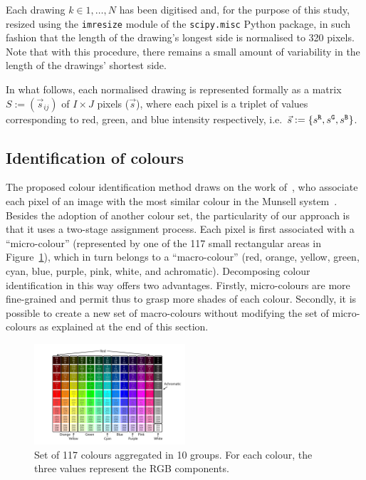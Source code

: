 \documentclass[11pt,a4paper]{article}
\begin{document}
Each drawing $k \in 1,\dots, N$ has been digitised and, for the purpose of this study, resized using the {\tt imresize} module of the {\tt scipy.misc} Python package, in such fashion that the length of the drawing's longest side is normalised to 320 pixels. Note that with this procedure, there remains a small amount of variability in the length of the drawings' shortest side. 

In what follows, each normalised drawing is represented formally as a matrix $S := (\vec{s}_{ij})$ of $I \times J$ pixels ($\vec{s}$), where each pixel is a triplet of values corresponding to red, green, and blue intensity respectively, i.e.~$\vec{s} := \{ s^{\tt \scriptstyle R}, s^{\tt \scriptstyle G}, s^{\tt \scriptstyle B} \}$.

\subsection{Identification of colours}
\label{sec:identification}

The proposed colour identification method draws on the work of~\citet{kimbaelee2007}, who associate each pixel of an image with the most similar colour in the Munsell system~\cite{Munsell1912}. 
Besides the adoption of another colour set, the particularity of our approach is that it uses a two-stage assignment process. Each pixel is first associated with a ``micro-colour'' (represented by one of the 117 small rectangular areas in Figure~\ref{fig:colour_set}), which in turn belongs to a ``macro-colour'' (red, orange, yellow, green, cyan, blue, purple, pink, white, and achromatic). Decomposing colour identification in this way offers two advantages. Firstly, micro-colours are more fine-grained and permit thus to grasp more shades of each colour.  Secondly, it is possible to create a new set of macro-colours without modifying the set of micro-colours as explained at the end of this section.

\begin{figure}
	\centering
	\includegraphics[width=0.5\textwidth]{figures/Col_tab.pdf}
	\caption{Set of 117 colours aggregated in 10 groups. For each colour, the three values represent the RGB components. \label{fig:colour_set}}
\end{figure}
\end{document}
